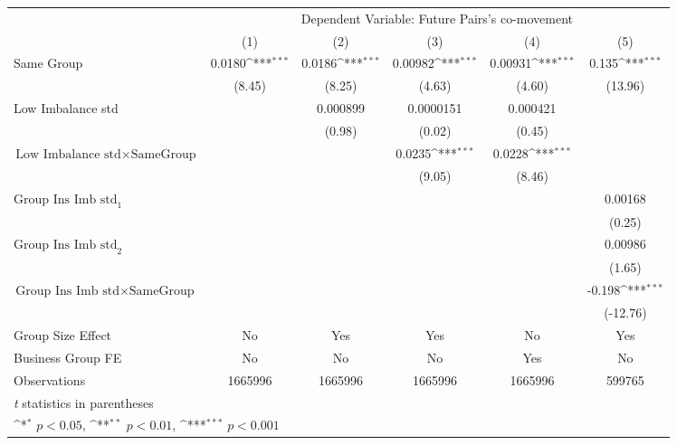 {
\def\sym#1{\ifmmode^{#1}\else\(^{#1}\)\fi}
\begin{tabular}{l*{5}{c}}
\hline\hline
                &\multicolumn{5}{c}{Dependent Variable: Future Pairs's co-movement}                            \\\cmidrule(lr){2-6}
                &\multicolumn{1}{c}{(1)}         &\multicolumn{1}{c}{(2)}         &\multicolumn{1}{c}{(3)}         &\multicolumn{1}{c}{(4)}         &\multicolumn{1}{c}{(5)}         \\
\hline
Same Group      &   0.0180\sym{***}&   0.0186\sym{***}&  0.00982\sym{***}&  0.00931\sym{***}&    0.135\sym{***}\\
                &   (8.45)         &   (8.25)         &   (4.63)         &   (4.60)         &  (13.96)         \\
[1em]
Low Imbalance std&                  & 0.000899         &0.0000151         & 0.000421         &                  \\
                &                  &   (0.98)         &   (0.02)         &   (0.45)         &                  \\
[1em]
 $ \text{Low Imbalance std} \times {\text{SameGroup} } $ &                  &                  &   0.0235\sym{***}&   0.0228\sym{***}&                  \\
                &                  &                  &   (9.05)         &   (8.46)         &                  \\
[1em]
 $ {\text{Group Ins Imb std}_1} $ &                  &                  &                  &                  &  0.00168         \\
                &                  &                  &                  &                  &   (0.25)         \\
[1em]
 $ {\text{Group Ins Imb std}_2} $ &                  &                  &                  &                  &  0.00986         \\
                &                  &                  &                  &                  &   (1.65)         \\
[1em]
$ {\text{Group Ins Imb std} } \times {\text{SameGroup} }  $ &                  &                  &                  &                  &   -0.198\sym{***}\\
                &                  &                  &                  &                  & (-12.76)         \\
\hline
Group Size Effect&       No         &      Yes         &      Yes         &       No         &      Yes         \\
Business Group FE&       No         &       No         &       No         &      Yes         &       No         \\
Observations    &  1665996         &  1665996         &  1665996         &  1665996         &   599765         \\
\hline\hline
\multicolumn{6}{l}{\footnotesize \textit{t} statistics in parentheses}\\
\multicolumn{6}{l}{\footnotesize \sym{*} \(p<0.05\), \sym{**} \(p<0.01\), \sym{***} \(p<0.001\)}\\
\end{tabular}
}
